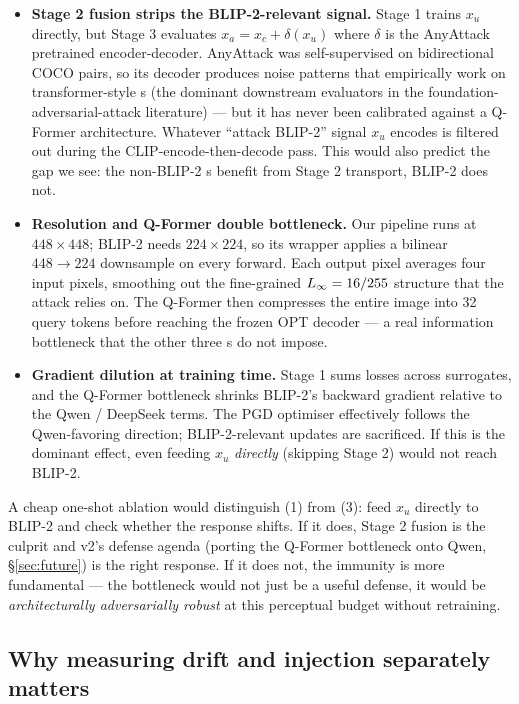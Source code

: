 \begin{itemize}
  \item \textbf{Stage 2 fusion strips the BLIP-2-relevant signal.} Stage 1 trains $x_u$ directly, but Stage 3 evaluates $x_a = x_c + \delta(x_u)$ where $\delta$ is the AnyAttack pretrained encoder-decoder. AnyAttack was self-supervised on bidirectional COCO pairs, so its decoder produces noise patterns that empirically work on transformer-style \vlm{}s (the dominant downstream evaluators in the foundation-adversarial-attack literature) --- but it has never been calibrated against a Q-Former architecture. Whatever ``attack BLIP-2'' signal $x_u$ encodes is filtered out during the CLIP-encode-then-decode pass. This would also predict the gap we see: the non-BLIP-2 \vlm{}s benefit from Stage 2 transport, BLIP-2 does not.
  \item \textbf{Resolution and Q-Former double bottleneck.} Our pipeline runs at $448 \times 448$; BLIP-2 needs $224 \times 224$, so its wrapper applies a bilinear $448 \to 224$ downsample on every forward. Each output pixel averages four input pixels, smoothing out the fine-grained $L_{\infty}{}=16/255$ structure that the attack relies on. The Q-Former then compresses the entire image into 32 query tokens before reaching the frozen OPT decoder --- a real information bottleneck that the other three \vlm{}s do not impose.
  \item \textbf{Gradient dilution at training time.} Stage 1 sums losses across surrogates, and the Q-Former bottleneck shrinks BLIP-2's backward gradient relative to the Qwen / DeepSeek terms. The PGD optimiser effectively follows the Qwen-favoring direction; BLIP-2-relevant updates are sacrificed. If this is the dominant effect, even feeding $x_u$ \emph{directly} (skipping Stage 2) would not reach BLIP-2.
\end{itemize}

A cheap one-shot ablation would distinguish (1) from (3): feed $x_u$ directly to BLIP-2 and check whether the response shifts. If it does, Stage 2 fusion is the culprit and v2's defense agenda (porting the Q-Former bottleneck onto Qwen, \S\ref{sec:future}) is the right response. If it does not, the immunity is more fundamental --- the bottleneck would not just be a useful defense, it would be \emph{architecturally adversarially robust} at this perceptual budget without retraining.

\subsection{Why measuring drift and injection separately matters}

